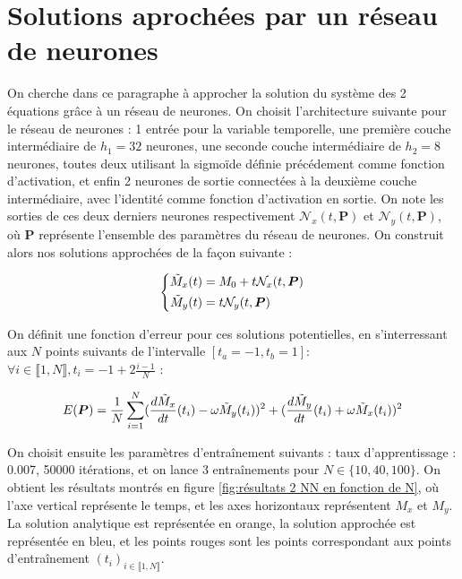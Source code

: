 \documentclass[12pt]{report}
\begin{document}
\section{Solutions aprochées par un réseau de neurones}
\label{section:2_NN}

On cherche dans ce paragraphe à approcher la solution du système des 2 équations grâce à un réseau de neurones.
On choisit l'architecture suivante pour le réseau de neurones : 
1 entrée pour la variable temporelle, une première couche intermédiaire de $h_1=32$ neurones, une seconde couche intermédiaire de $h_2=8$ neurones, toutes deux utilisant la sigmoïde définie précédement comme fonction d'activation, et enfin 2 neurones de sortie connectées à la deuxième couche intermédiaire, avec l'identité comme fonction d'activation en sortie.
On note les sorties de ces deux derniers neurones respectivement $\mathcal{N}_x(t, \bm{P})$ et $\mathcal{N}_y(t, \bm{P})$, où $\bm{P}$ représente l'ensemble des paramètres du réseau de neurones.
On construit alors nos solutions approchées de la façon suivante :

\begin{equation}
    \left\{
        \begin{aligned}
            \Tilde{M}_x(t) &= M_0+ t\mathcal{N}_x(t, \bm{P}) \\
            \Tilde{M}_y(t) &= t\mathcal{N}_y(t, \bm{P})
        \end{aligned}
    \right.
    \label{eq:solution 2_NN}
    \end{equation}

On définit une fonction d'erreur pour ces solutions potentielles, en s'interressant aux $N$ points suivants de l'intervalle $[t_a=-1, t_b=1]$: 
$\forall i \in\llbracket 1,N \rrbracket, t_i = -1 + 2\frac{i-1}{N} $ :

\begin{equation}
        E(\bm{P}) = \frac{1}{N}\sum_{i=1}^{N} (\frac{d\Tilde{M}_x}{dt}(t_i) - \omega \Tilde{M}_y(t_i))^2 + (\frac{d\Tilde{M}_y}{dt}(t_i) + \omega \Tilde{M}_x(t_i))^2
\label{eq:erreur 2_NN}
\end{equation}


On choisit ensuite les paramètres d'entraînement suivants : taux d'apprentissage : 0.007, 50000 itérations, et on lance 3 entraînements pour $N \in \{10,40,100\}$. 
On obtient les résultats montrés en figure \ref{fig:résultats 2 NN en fonction de N}, où l'axe vertical représente le temps, et les axes horizontaux représentent $M_x$ et $M_y$. 
La solution analytique est représentée en orange, la solution approchée est représentée en bleu, et les points rouges sont les points correspondant aux points d'entraînement $(t_i)_{i \in \llbracket 1, N \rrbracket}$.
\end{document}
